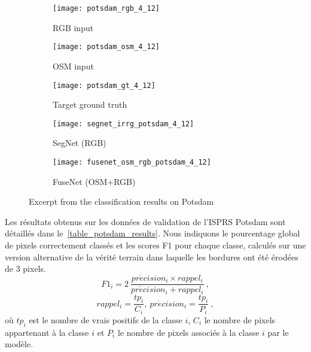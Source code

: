 \begin{figure}[h]
\begin{subfigure}{0.33\linewidth}
	\texttt{[image: potsdam\_rgb\_4\_12]}
    \caption{RGB input}
\end{subfigure}
\hfill
\begin{subfigure}{0.33\linewidth}
    \texttt{[image: potsdam\_osm\_4\_12]}
    \caption{OSM input}
\end{subfigure}
\hfill
\begin{subfigure}{0.33\linewidth}
	\texttt{[image: potsdam\_gt\_4\_12]}
    \caption{Target ground truth}
\end{subfigure}
\begin{subfigure}{0.49\linewidth}
	\texttt{[image: segnet\_irrg\_potsdam\_4\_12]}
    \caption{SegNet (RGB)}
\end{subfigure}
\hfill
\begin{subfigure}{0.49\linewidth}
	\texttt{[image: fusenet\_osm\_rgb\_potsdam\_4\_12]}
    \caption{FuseNet (OSM+RGB)}
\end{subfigure}
\caption{Excerpt from the classification results on Potsdam}
\label{fig:potsdam_qualitative}
\end{figure}


Les résultats obtenus sur les données de validation de l'\gls{ISPRS} Potsdam sont détaillés dans le~\cref{table_potsdam_results}. Nous indiquons le pourcentage global de pixels correctement classés et les scores F1 pour chaque classe, calculés sur une version alternative de la vérité terrain dans laquelle les bordures ont été érodées de 3 pixels.
\begin{equation}
F1_{i} = 2~\frac{pr\acute{e}cision_{i} \times rappel_{i}}{pr\acute{e}cision_{i} + rappel_{i}}~,
\end{equation}
\begin{equation}
rappel_i = \frac{tp_i}{C_i},~ pr\acute{e}cision_i = \frac{tp_i}{P_i}~,
\end{equation}
où $tp_i$ est le nombre de vrais positifs de la classe $i$, $C_i$ le nombre de pixels appartenant à la classe $i$ et $P_i$ le nombre de pixels associés à la classe $i$ par le modèle.


